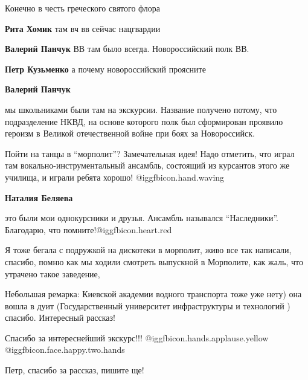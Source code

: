 \begin{itemize}
\begin{itemize}
Конечно в честь греческого святого флора

\textbf{Рита Хомик} там вч вв сейчас нацгвардии

\begin{itemize} %
\textbf{Валерий Панчук} ВВ там было всегда. Новороссийский полк ВВ.

\textbf{Петр Кузьменко} а почему новороссийский проясните

\textbf{Валерий Панчук} 

мы школьниками были там на экскурсии. Название получено потому, что
подразделение НКВД, на основе которого полк был сформирован проявило героизм в
Великой отечественной войне при боях за Новороссийск.

\end{itemize} %

\end{itemize} %


Пойти на танцы в \enquote{морполит}? Замечательная идея! Надо отметить, что играл там
вокально-инструментальный ансамбль, состоящий из курсантов этого же училища, и
играли ребята хорошо!  @igg{fbicon.hand.waving} 

\begin{itemize} %
\textbf{Наталия Беляева} 

это были мои однокурсники и друзья. Ансамбль назывался \enquote{Наследники}.
Благодарю, что помните!@igg{fbicon.heart.red}


Я тоже бегала с подружкой на дискотеки в морполит, живо все так написали,
спасибо, помню как мы ходили смотреть выпускной в Морполите, как жаль, что
утрачено такое заведение,

\end{itemize} %


Небольшая ремарка: Киевской академии водного транспорта тоже уже нету) она
вошла в дуит (Государственный университет инфраструктуры и технологий )
спасибо. Интересный рассказ!


Спасибо за интереснейший экскурс!!!  @igg{fbicon.hands.applause.yellow}  @igg{fbicon.face.happy.two.hands} 

Петр, спасибо за рассказ, пишите ще!


\end{itemize}
